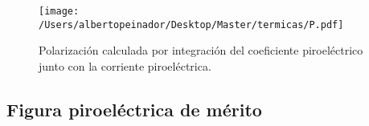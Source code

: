 \documentclass[a4paper, 12pt, spanish]{article}
\begin{document}
\begin{multicols}{2}
\begin{figure}[H]
    \centering
    \texttt{[image: /Users/albertopeinador/Desktop/Master/termicas/P.pdf]}
    \caption{Polarización calculada por integración del coeficiente piroeléctrico junto con la corriente piroeléctrica.}\label{fig:pol}
\end{figure}
\subsection*{Figura piroeléctrica de mérito}




\end{multicols}
\end{document}
